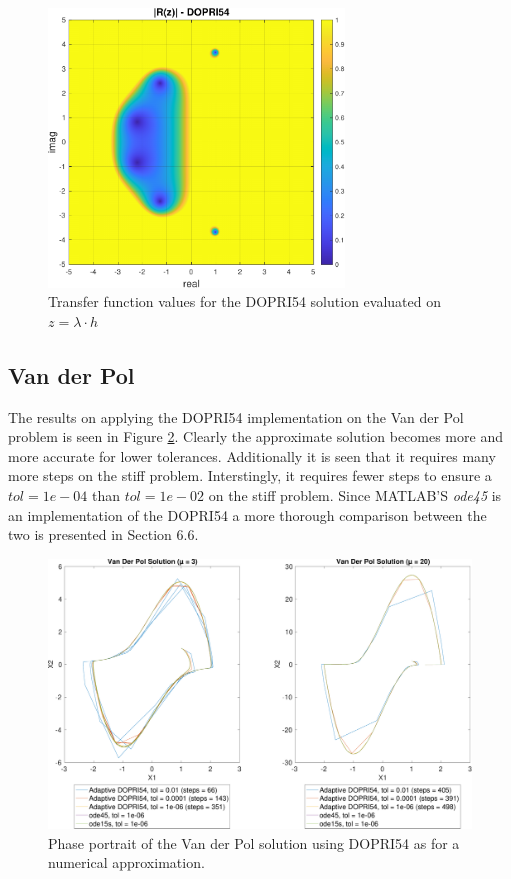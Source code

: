 \begin{figure}[H]
    \centering
    \includegraphics[width=0.7\textwidth]{plots/6_3c.pdf}
    \caption{Transfer function values for the DOPRI54 solution evaluated on $z = \lambda \cdot h$}
    \label{fig:6_3c}
\end{figure}







\subsection{Van der Pol}
The results on applying the DOPRI54 implementation on the Van der Pol problem is seen in Figure \ref{fig:6_4}. Clearly the approximate solution becomes more and more accurate for lower tolerances. Additionally it is seen that it requires many more steps on the stiff problem. Interstingly, it requires fewer steps to ensure a $tol = 1e-04$ than $tol = 1e-02$ on the stiff problem. Since MATLAB'S \textit{ode45} is an implementation of the DOPRI54 a more thorough comparison between the two is presented in Section 6.6.

\begin{figure}[h]
    \centering
    \includegraphics[width=\textwidth]{plots/6_5.pdf}
    \caption{Phase portrait of the Van der Pol solution using DOPRI54 as for a numerical approximation.}
    \label{fig:6_4}
\end{figure}






